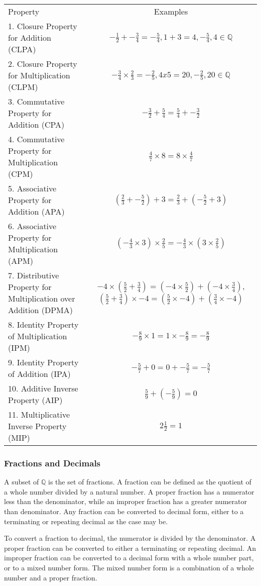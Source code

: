 \begin{tabularx}{\linewidth}{XC}
Property & Examples\\
1. Closure Property for Addition (CLPA) & $-\frac{1}{2}+-\frac{3}{4}=-\frac{5}{4},1+3=4,-\frac{5}{4},4\in \mathbb{Q}$\\
2. Closure Property for Multiplication (CLPM) & $-\frac{3}{4}\times \frac{2}{3}=-\frac{2}{5},4 x 5 = 20, -\frac{2}{5},20 \in \mathbb Q$\\
3. Commutative Property for Addition (CPA) & $-\frac{3}{2}+\frac{5}{4}=\frac{5}{4}+-\frac{3}{2}$\\
4. Commutative Property for Multiplication (CPM) & $\frac{4}{7}\times 8=8\times\frac{4}{7}$\\
5. Associative Property for Addition (APA) & $(\frac{2}{3}+-\frac{5}{2})+3=\frac{2}{3}+(-\frac{5}{2}+3)$\\
6. Associative Property for Multiplication (APM) & $(-\frac{4}{3}\times 3)\times \frac{2}{5}=-\frac{4}{3}\times (3\times \frac{2}{5})$\\
7. Distributive Property for Multiplication over Addition (DPMA) & $-4\times (\frac{5}{2}+\frac{3}{4})=(-4\times\frac{5}{2})+(-4\times\frac{3}{4})$, $(\frac{5}{2}+\frac{3}{4})\times -4=(\frac{5}{2}\times-4)+(\frac{3}{4}\times-4)$\\
8. Identity Property of Multiplication (IPM) & $-\frac{8}{9}\times 1=1\times-\frac{8}{9}=-\frac{8}{9}$\\
9. Identity Property of Addition (IPA) & $-\frac{5}{7}+0=0+-\frac{5}{7}=-\frac{5}{7}$\\
10. Additive Inverse Property (AIP) & $\frac{5}{9}+(-\frac{5}{9}) = 0$\\
11. Multiplicative Inverse Property (MIP) & $2\frac{1}{2}=1$\\
\end{tabularx}

\subsubsection*{Fractions and Decimals}
A subset of $\mathbb Q$ is the set of fractions. A fraction can be defined as the quotient of a whole
number divided by a natural number. A proper fraction has a numerator less than the denominator,
while an improper fraction has a greater numerator than denominator. Any fraction can be
converted to decimal form, either to a terminating or repeating decimal as the case may be.

To convert a fraction to decimal, the numerator is divided by the denominator. A proper
fraction can be converted to either a terminating or repeating decimal. An improper fraction can be
converted to a decimal form with a whole number part, or to a mixed number form. The mixed
number form is a combination of a whole number and a proper fraction.

